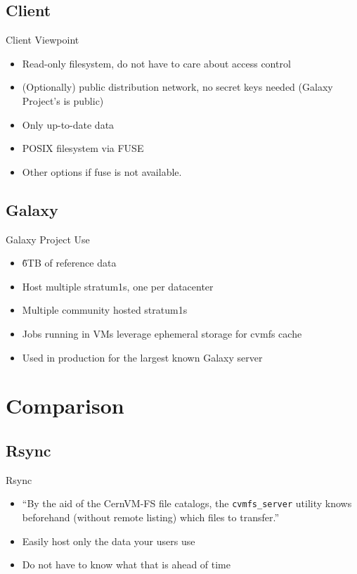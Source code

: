 \documentclass[12pt]{ufrslides}
\begin{document}
\subsection{Client}
\begin{frame}{Client Viewpoint}
	\begin{itemize}
		\item Read-only filesystem, do not have to care about access control
		\item (Optionally) public distribution network, no secret keys needed (Galaxy Project's is public)
		\item Only up-to-date data
		\item POSIX filesystem via FUSE
		\item Other options if fuse is not available.
	\end{itemize}
\end{frame}

\subsection{Galaxy}
\begin{frame}{Galaxy Project Use}
	\begin{itemize}
		\item \~6TB of reference data
		\item Host multiple stratum1s, one per datacenter
		\item Multiple community hosted stratum1s
		\item Jobs running in VMs leverage ephemeral storage for cvmfs cache
		\item Used in production for the largest known Galaxy server
	\end{itemize}
\end{frame}

\section{Comparison}
\subsection{Rsync}
\begin{frame}{Rsync}
	\begin{itemize}
		\item ``By the aid of the CernVM-FS file catalogs, the \texttt{cvmfs\_server} utility knows beforehand (without remote listing) which files to transfer.''
		\item Easily host only the data your users use
		\item Do not have to know what that is ahead of time
	\end{itemize}
\end{frame}
\end{document}
